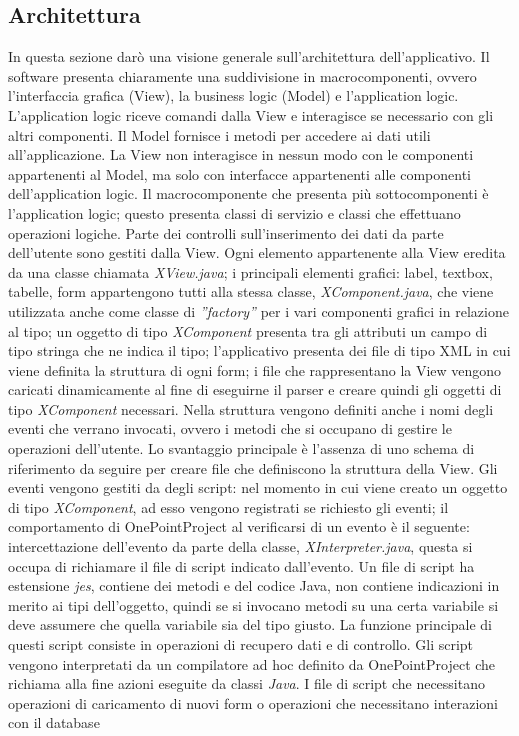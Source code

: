 \subsection{Architettura}
In questa sezione dar\`{o} una visione generale sull\textquoteright{}architettura dell\textquoteright{}applicativo. Il software presenta chiaramente una suddivisione in macrocomponenti, ovvero l\textquoteright{}interfaccia grafica (View), la business logic (Model) e l\textquoteright{}application logic. L\textquoteright{}application logic riceve comandi dalla View e interagisce se necessario con gli altri componenti. Il Model fornisce i metodi per accedere ai dati utili all\textquoteright{}applicazione. La View non interagisce in nessun modo con le componenti appartenenti al Model, ma solo con interfacce appartenenti alle componenti dell\textquoteright{}application logic. Il macrocomponente che presenta pi\`{u} sottocomponenti \`{e} l\textquoteright{}application logic; questo presenta classi di servizio e classi che effettuano operazioni logiche. Parte dei controlli sull\textquoteright{}inserimento dei dati da parte dell\textquoteright{}utente sono gestiti dalla View. Ogni elemento appartenente alla View eredita da una classe chiamata \textit{XView.java}; i principali elementi grafici: label, textbox, tabelle, form appartengono tutti alla stessa classe, \textit{XComponent.java}, che viene utilizzata anche come classe di \textit{''factory''} per i vari componenti grafici in relazione al tipo; un oggetto di tipo \textit{XComponent} presenta tra gli attributi un campo di tipo stringa che ne indica il tipo; l\textquoteright{}applicativo presenta dei file di tipo XML in cui viene definita la struttura di ogni form; i file che rappresentano la View vengono caricati dinamicamente al fine di eseguirne il parser e creare quindi gli oggetti di tipo \textit{XComponent} necessari. Nella struttura vengono definiti anche i nomi degli eventi che verrano invocati, ovvero i metodi che si occupano di gestire le operazioni dell\textquoteright{}utente. Lo svantaggio principale \`{e} l\textquoteright{}assenza di uno schema di riferimento da seguire per creare file che definiscono la struttura della View. Gli eventi vengono gestiti da degli script: nel momento in cui viene creato un oggetto di tipo \textit{XComponent}, ad esso vengono registrati se richiesto gli eventi; il comportamento di OnePointProject al verificarsi di un evento \`{e} il seguente: intercettazione dell\textquoteright{}evento da parte della classe, \textit{XInterpreter.java}, questa si occupa di richiamare il file di script indicato dall\textquoteright{}evento. Un file di script ha estensione \textit{jes}, contiene dei metodi e del codice Java, non contiene indicazioni in merito ai tipi dell\textquoteright{}oggetto, quindi se si invocano metodi su una certa variabile si deve assumere che quella variabile sia del tipo giusto. La funzione principale di questi script consiste in operazioni di recupero dati e di controllo. Gli script vengono interpretati da un compilatore ad hoc definito da OnePointProject che richiama alla fine azioni eseguite da classi \textit{Java}. I file di script che necessitano operazioni di caricamento di nuovi form o operazioni che necessitano interazioni con il database 